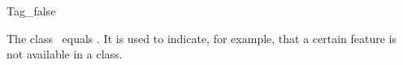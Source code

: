 \begin{ccRefClass}{Tag_false}

\ccDefinition

The class \ccRefName\ equals .
It is used to indicate, for example,
that a certain feature is not available in a class.



\ccSeeAlso
{} \\
 \\

\end{ccRefClass}
